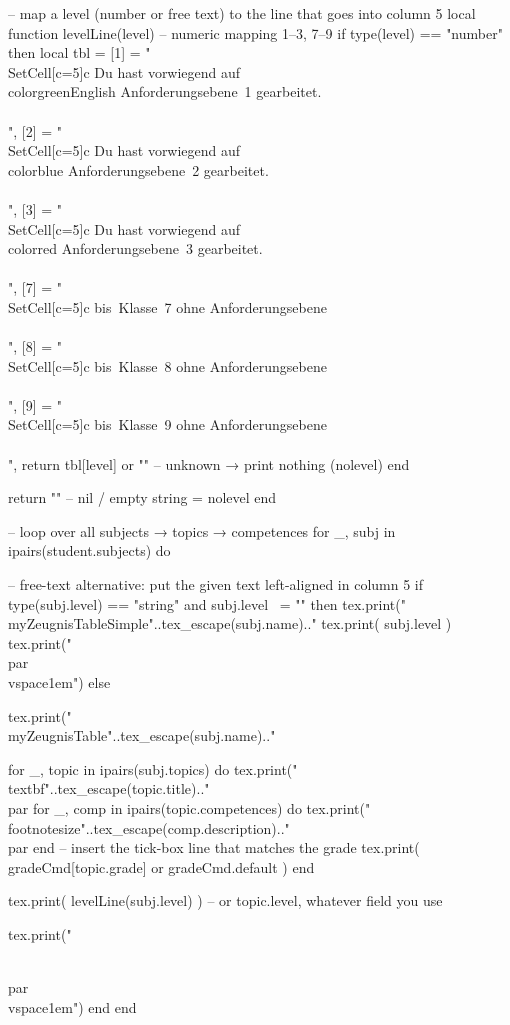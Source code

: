 \begin{luacode*}
	-- map a level (number or free text) to the line that goes into column 5
	local function levelLine(level)
	-- numeric mapping 1–3, 7–9
	if type(level) == "number" then
	local tbl = {
		[1] = "\\SetCell[c=5]{c} Du hast vorwiegend auf {\\color{greenEnglish} Anforderungsebene~1} gearbeitet.\\\\",
		[2] = "\\SetCell[c=5]{c} Du hast vorwiegend auf {\\color{blue} Anforderungsebene~2} gearbeitet.\\\\",
		[3] = "\\SetCell[c=5]{c} Du hast vorwiegend auf {\\color{red} Anforderungsebene~3} gearbeitet.\\\\",
		[7] = "\\SetCell[c=5]{c} bis~Klasse~7 ohne Anforderungsebene\\\\",
		[8] = "\\SetCell[c=5]{c} bis~Klasse~8 ohne Anforderungsebene\\\\",
		[9] = "\\SetCell[c=5]{c} bis~Klasse~9 ohne Anforderungsebene\\\\",
	}
	return tbl[level] or ""          -- unknown → print nothing (nolevel)
	end
	
	return ""                          -- nil / empty string  =  nolevel
	end
	
	
	-- loop over all subjects → topics → competences
	for _, subj in ipairs(student.subjects) do
	
	
	-- free-text alternative: put the given text left-aligned in column 5
	if type(subj.level) == "string" and subj.level ~= "" then
	tex.print("\\myZeugnisTableSimple{"..tex_escape(subj.name).."}{%
		tex.print( subj.level )
		tex.print("}\\par\\vspace{1em}")
	else
	
	tex.print("\\myZeugnisTable{"..tex_escape(subj.name).."}{%
		
		for _, topic in ipairs(subj.topics) do
		tex.print("\\textbf{"..tex_escape(topic.title).."}\\par%
		for _, comp in ipairs(topic.competences) do
		tex.print("\\footnotesize{"..tex_escape(comp.description).."}\\par%
		end
		-- insert the tick-box line that matches the grade
		tex.print( gradeCmd[topic.grade] or gradeCmd.default )
		end
		
		tex.print( levelLine(subj.level) )   -- or topic.level, whatever field you use
		
		tex.print("}\\par\\vspace{1em}")
	end
	end
\end{luacode*}
